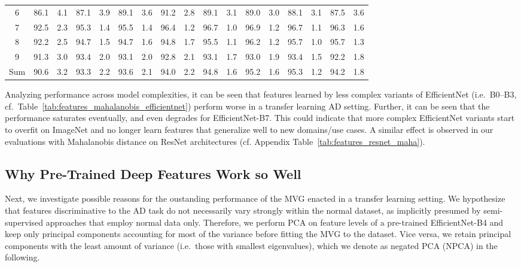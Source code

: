 \documentclass[conference, a4paper]{./template/IEEEtran}
\begin{document}
\begin{table*}
\begin{tabular}{@{}crrrrrrrrrrrrrrrr@{}}
		6   & 86.1 & 4.1 & 87.1 & 3.9 & 89.1 & 3.6 & 91.2 & 2.8 & 89.1 & 3.1 & 89.0 & 3.0 & 88.1 & 3.1 & 87.5 & 3.6 \\
		7   & 92.5 & 2.3 & 95.3 & 1.4 & 95.5 & 1.4 & 96.4 & 1.2 & 96.7 & 1.0 & 96.9 & 1.2 & 96.7 & 1.1 & 96.3 & 1.6 \\
		8   & 92.2 & 2.5 & 94.7 & 1.5 & 94.7 & 1.6 & 94.8 & 1.7 & 95.5 & 1.1 & 96.2 & 1.2 & 95.7 & 1.0 & 95.7 & 1.3 \\
		9   & 91.3 & 3.0 & 93.4 & 2.0 & 93.1 & 2.0 & 92.8 & 2.1 & 93.1 & 1.7 & 93.0 & 1.9 & 93.4 & 1.5 & 92.2 & 1.8 \\
		\midrule
		Sum & 90.6 & 3.2 & 93.3	& 2.2 & 93.6 & 2.1 & 94.0 & 2.2 & 94.8 & 1.6 & 95.2 & 1.6 & 95.3 & 1.2 & 94.2 & 1.8 \\
		\bottomrule
	\end{tabular}
\end{table*}

Analyzing performance across model complexities, it can be seen that features learned by less complex variants of EfficientNet (i.e.\ B0--B3, cf.\ Table~\ref{tab:features_mahalanobis_efficientnet}) perform worse in a transfer learning AD setting.
Further, it can be seen that the performance saturates eventually, and even degrades for EfficientNet-B7.
This could indicate that more complex EfficientNet variants start to overfit on ImageNet and no longer learn features that generalize well to new domains/use cases.
A similar effect is observed in our evaluations with Mahalanobis distance on ResNet architectures (cf. Appendix Table~\ref{tab:features_resnet_maha}).

\subsection{Why Pre-Trained Deep Features Work so Well}
Next, we investigate possible reasons for the oustanding performance of the MVG enacted in a transfer learning setting.
We hypothesize that features discriminative to the AD task do not necessarily vary strongly within the normal dataset, as implicitly presumed by semi-supervised approaches that employ normal data only. Therefore, we perform PCA on feature levels of a pre-trained EfficientNet-B4 and keep only principal components accounting for most of the variance before fitting the MVG to the dataset.
Vice versa, we retain principal components with the least amount of variance (i.e.\ those with smallest eigenvalues), which we denote as negated PCA (NPCA) in the following.
\end{document}

